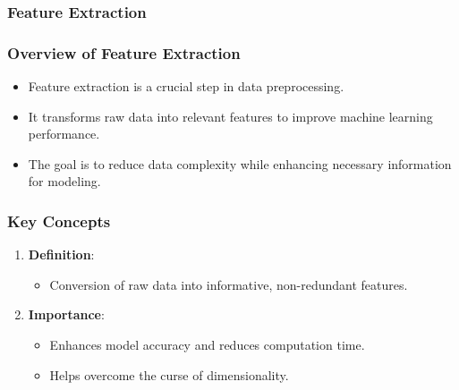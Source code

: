 \documentclass[aspectratio=169]{beamer}
\begin{document}
\begin{frame}
    \frametitle{Feature Extraction}
\end{frame}

\begin{frame}[fragile]
    \frametitle{Overview of Feature Extraction}
    \begin{itemize}
        \item Feature extraction is a crucial step in data preprocessing.
        \item It transforms raw data into relevant features to improve machine learning performance.
        \item The goal is to reduce data complexity while enhancing necessary information for modeling.
    \end{itemize}
\end{frame}

\begin{frame}[fragile]
    \frametitle{Key Concepts}
    \begin{enumerate}
        \item \textbf{Definition}: 
            \begin{itemize}
                \item Conversion of raw data into informative, non-redundant features.
            \end{itemize}
        
        \item \textbf{Importance}:
            \begin{itemize}
                \item Enhances model accuracy and reduces computation time.
                \item Helps overcome the curse of dimensionality.
            \end{itemize}
    \end{enumerate}
\end{frame}
\end{document}
